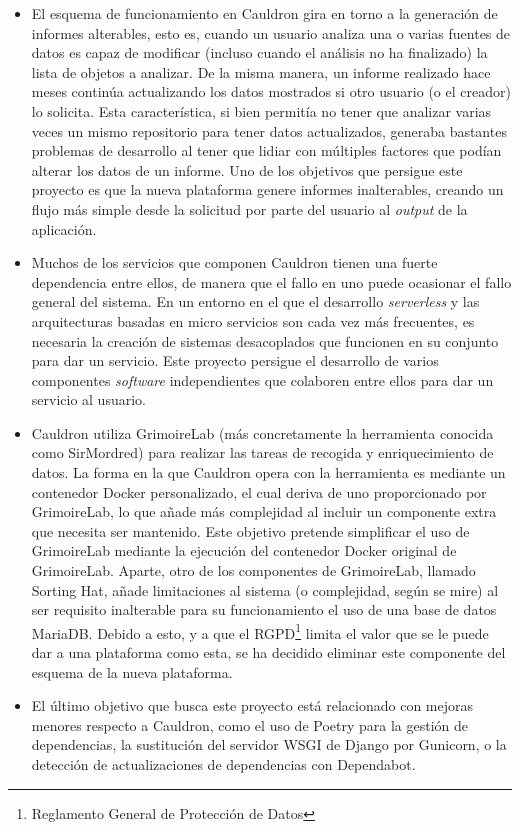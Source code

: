 \begin{itemize}
    \item El esquema de funcionamiento en Cauldron gira en torno a la generación de informes alterables, esto es, cuando un usuario analiza una o varias fuentes de datos es capaz de modificar (incluso cuando el análisis no ha finalizado) la lista de objetos a analizar. De la misma manera, un informe realizado hace meses continúa actualizando los datos mostrados si otro usuario (o el creador) lo solicita. Esta característica, si bien permitía no tener que analizar varias veces un mismo repositorio para tener datos actualizados, generaba bastantes problemas de desarrollo al tener que lidiar con múltiples factores que podían alterar los datos de un informe. Uno de los objetivos que persigue este proyecto es que la nueva plataforma genere informes inalterables, creando un flujo más simple desde la solicitud por parte del usuario al \emph{output} de la aplicación.
    \item Muchos de los servicios que componen Cauldron tienen una fuerte dependencia entre ellos, de manera que el fallo en uno puede ocasionar el fallo general del sistema. En un entorno en el que el desarrollo \emph{serverless} y las arquitecturas basadas en micro servicios son cada vez más frecuentes, es necesaria la creación de sistemas desacoplados que funcionen en su conjunto para dar un servicio. Este proyecto persigue el desarrollo de varios componentes \emph{software} independientes que colaboren entre ellos para dar un servicio al usuario.
    \item Cauldron utiliza GrimoireLab (más concretamente la herramienta conocida como SirMordred) para realizar las tareas de recogida y enriquecimiento de datos. La forma en la que Cauldron opera con la herramienta es mediante un contenedor Docker personalizado, el cual deriva de uno proporcionado por GrimoireLab, lo que añade más complejidad al incluir un componente extra que necesita ser mantenido. Este objetivo pretende simplificar el uso de GrimoireLab mediante la ejecución del contenedor Docker original de GrimoireLab. Aparte, otro de los componentes de GrimoireLab, llamado Sorting Hat, añade limitaciones al sistema (o complejidad, según se mire) al ser requisito inalterable para su funcionamiento el uso de una base de datos MariaDB. Debido a esto, y a que el RGPD\footnote{Reglamento General de Protección de Datos} limita el valor que se le puede dar a una plataforma como esta, se ha decidido eliminar este componente del esquema de la nueva plataforma.
    \item El último objetivo que busca este proyecto está relacionado con mejoras menores respecto a Cauldron, como el uso de Poetry para la gestión de dependencias, la sustitución del servidor WSGI de Django por Gunicorn, o la detección de actualizaciones de dependencias con Dependabot.
\end{itemize}
